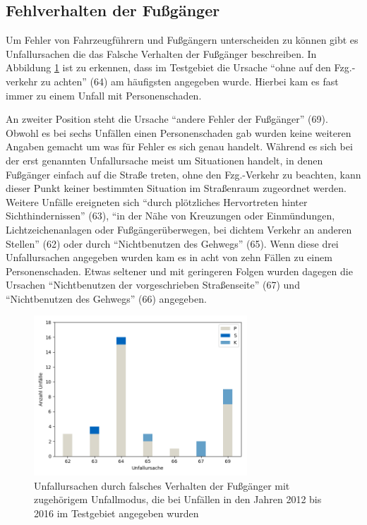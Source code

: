 \subsection{Fehlverhalten der Fußgänger}
Um Fehler von Fahrzeugführern und Fußgängern unterscheiden zu können gibt es Unfallursachen die das Falsche Verhalten der Fußgänger beschreiben. In Abbildung \ref{fig:Fehlverhalten_Fussgaenger} ist zu erkennen, dass im Testgebiet die Ursache \enquote{ohne auf den Fzg.-verkehr zu achten} (64) am häufigsten angegeben wurde. Hierbei kam es fast immer zu einem Unfall mit Personenschaden.

An zweiter Position steht die Ursache \enquote{andere Fehler der Fußgänger} (69). Obwohl es bei sechs Unfällen einen Personenschaden gab wurden keine weiteren Angaben gemacht um was für Fehler es sich genau handelt. Während es sich bei der erst genannten Unfallursache meist um Situationen handelt, in denen Fußgänger einfach auf die Straße treten, ohne den Fzg.-Verkehr zu beachten, kann dieser Punkt keiner bestimmten Situation im Straßenraum zugeordnet werden. Weitere Unfälle ereigneten sich \enquote{durch plötzliches Hervortreten hinter Sichthindernissen} (63), \enquote{in der Nähe von Kreuzungen oder Einmündungen, Lichtzeichenanlagen oder Fußgängerüberwegen, bei dichtem Verkehr an anderen Stellen} (62) oder durch \enquote{Nichtbenutzen des Gehwegs} (65). Wenn diese drei Unfallursachen angegeben wurden kam es in acht von zehn Fällen zu einem Personenschaden. Etwas seltener und mit geringeren Folgen wurden dagegen die Ursachen \enquote{Nichtbenutzen der vorgeschrieben Straßenseite} (67) und \enquote{Nichtbenutzen des Gehwegs} (66) angegeben.

\begin{savenotes}
	\begin{figure}[H]
		\centering
		\includegraphics[width=8cm,height=6cm]{figures/Urs_Fussgaenger}
		\caption[Unfallursachen durch falsches Verhalten der Fußgänger mit zugehörigem Unfallmodus, die bei Unfällen in den Jahren 2012 bis 2016 im Testgebiet angegeben wurden]{Unfallursachen durch falsches Verhalten der Fußgänger mit zugehörigem Unfallmodus, die bei Unfällen in den Jahren 2012 bis 2016 im Testgebiet angegeben wurden}\label{fig:Fehlverhalten_Fussgaenger}
	\end{figure}
\end{savenotes}

